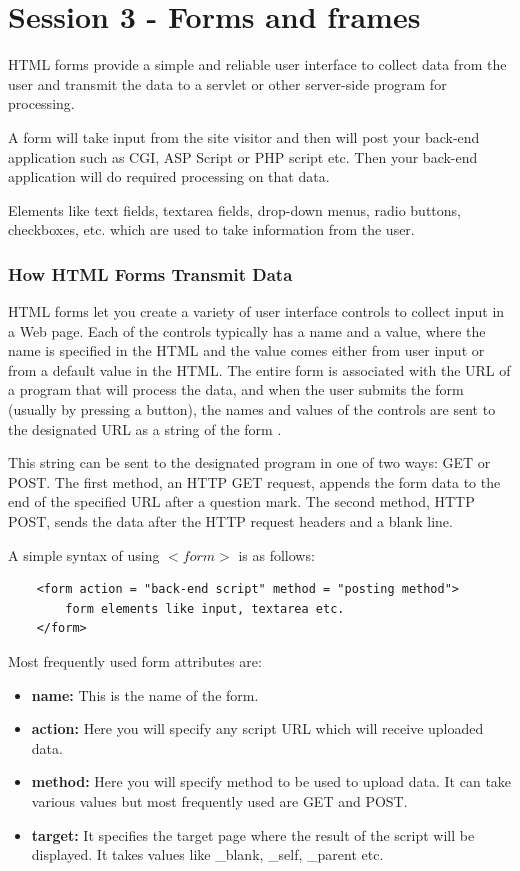 \documentclass[11pt,a4paper]{article}
\author{TalentSprint}
\date{}
\begin{document}
\chapter*{Session 3 - Forms and frames} 
HTML forms provide a simple and reliable user interface to collect data from the user and transmit the data to a servlet or other server-side program for processing.

A form will take input from the site visitor and then will post your back-end application such as CGI, ASP Script or PHP script etc. Then your back-end application will do required processing on that data.

Elements like text fields, textarea fields, drop-down menus, radio buttons, checkboxes, etc. which are used to take information from the user.
\subsection*{How HTML Forms Transmit Data}
HTML forms let you create a variety of user interface controls to collect input in a Web page. Each of the controls typically has a name and a value, where the name is specified in the HTML and the value comes either from user input or from a default value in the HTML. The entire form is associated with the URL of a program that will process the data, and when the user submits the form (usually by pressing a button), the names and values of the controls are sent to the designated URL as a string of the form .

This string can be sent to the designated program in one of two ways: GET or POST. The first method, an HTTP GET request, appends the form data to the end of the specified URL after a question mark. The second method, HTTP POST, sends the data after the HTTP request headers and a blank line.

A simple syntax of using $<form>$ is as follows:
\begin{verbatim}
    <form action = "back-end script" method = "posting method">
        form elements like input, textarea etc.
    </form>
\end{verbatim}

Most frequently used form attributes are:
\begin{itemize}
\item \textbf{name:} This is the name of the form.
\item \textbf{action:} Here you will specify any script URL which will receive uploaded data.
\item \textbf{method:} Here you will specify method to be used to upload data. It can take various values but most frequently used are GET and POST.
\item \textbf{target:} It specifies the target page where the result of the script will be displayed. It takes values like \_blank, \_self, \_parent etc.
\end{itemize}
\end{document}
